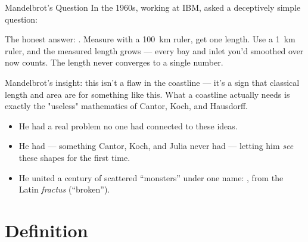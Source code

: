 \begin{frame}{Mandelbrot's Question}
  \small
  In the 1960s, working at IBM,  asked a
  deceptively simple question:

  \begin{center}
  \end{center}

  \pause
  \vspace{0.2cm}
  The honest answer: . Measure
  with a 100~km ruler, get one length. Use a 1~km ruler, and the
  measured length grows — every bay and inlet you'd smoothed over
  now counts. The length never converges to a single number.

  \pause
  \vspace{0.2cm}
  Mandelbrot's insight: this isn't a flaw in the coastline — it's a
  sign that classical length and area are 
  for something like this. What a coastline actually needs is exactly
  the "useless" mathematics of Cantor, Koch, and Hausdorff.

  \pause
  \vspace{0.2cm}
  \begin{itemize}
    \item He had a real problem no one had connected to these ideas.
    \item He had  — something Cantor, Koch, and
      Julia never had — letting him \emph{see} these shapes for the
      first time.
    \item He united a century of scattered ``monsters'' under one
      name: , from the Latin \textit{fractus}
      (``broken'').
  \end{itemize}
\end{frame}

\section{Definition}


